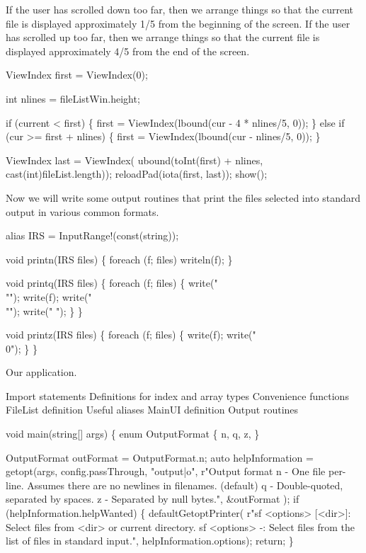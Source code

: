 If the user has scrolled down too far, then we arrange things so that
the current file is displayed approximately 1/5 from the beginning of
the screen. If the user has scrolled up too far, then we arrange
things so that the current file is displayed approximately 4/5 from
the end of the screen.

\nwenddocs{}\plusendmoddef\nwstartdeflinemarkup\nwenddeflinemarkup
ViewIndex first = ViewIndex(0);

\nwendcode{}\endmoddef\nwstartdeflinemarkup\nwenddeflinemarkup
int nlines = fileListWin.height;

if (current < first) \{
  first = ViewIndex(lbound(cur - 4 * nlines/5, 0));
\} else if (cur >= first + nlines) \{
  first = ViewIndex(lbound(cur - nlines/5, 0));
\}

ViewIndex last = ViewIndex(
  ubound(toInt(first) + nlines,
         cast(int)fileList.length));
reloadPad(iota(first, last));
show();

\nwendcode{}Now we will write some output routines that print the files selected
into standard output in various common formats.

\nwenddocs{}\endmoddef\nwstartdeflinemarkup\nwenddeflinemarkup
alias IRS = InputRange!(const(string));

void printn(IRS files)
\{
  foreach (f; files) writeln(f);
\}

void printq(IRS files)
\{
  foreach (f; files) \{
    write("\\""); write(f); write("\\"");
    write(" ");
  \}
\}

void printz(IRS files)
\{
  foreach (f; files) \{
    write(f);
    write("\\0");
  \}
\}

\nwendcode{}Our application.

\nwenddocs{}\endmoddef\nwstartdeflinemarkup\nwenddeflinemarkup
\LA{}Import statements\RA{}
\LA{}Definitions for index and array types\RA{}
\LA{}Convenience functions\RA{}
\LA{}FileList definition\RA{}
\LA{}Useful aliases\RA{}
\LA{}MainUI definition\RA{}
\LA{}Output routines\RA{}

void main(string[] args)
\{
  enum OutputFormat \{
  n,
  q,
  z,
  \}

  OutputFormat outFormat = OutputFormat.n;
  auto helpInformation =
    getopt(args,
     config.passThrough,
     "output|o", r"Output format
    n - One file per-line. Assumes there are no newlines in filenames. (default)
    q - Double-quoted, separated by spaces.
    z - Separated by null bytes.", &outFormat
    );
  if (helpInformation.helpWanted) \{
    defaultGetoptPrinter(
      r"sf <options> [<dir>]: Select files from <dir> or current directory.
sf <options> -: Select files from the list of files in standard input.",
      helpInformation.options);
    return;
  \}

